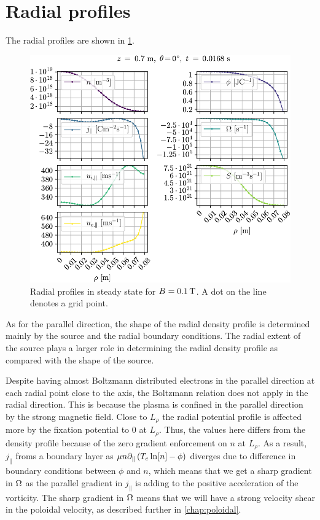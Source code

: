 \section{Radial profiles}
%
The radial profiles are shown in \cref{fig:radProfs}.
%
\begin{figure}[htb]
    \centering
    \includegraphics{fig/results/1DProfiles/B010Rad}
    \caption{Radial profiles in steady state for $B=0.1\, \text{T}$.
        A dot on the line denotes a grid point.
    }
    \label{fig:radProfs}
\end{figure}
%
As for the parallel direction, the shape of the radial density profile is determined mainly by the source and the radial boundary conditions.
The radial extent of the source plays a larger role in determining the radial density profile as compared with the shape of the source.

Despite having almost Boltzmann distributed electrons in the parallel direction at each radial point close to the axis, the Boltzmann relation does not apply in the radial direction.
This is because the plasma is confined in the parallel direction by the strong magnetic field.
Close to $L_\rho$ the radial potential profile is affected more by the fixation potential to $0$ at $L_\rho$.
Thus, the values here differs from the density profile because of the zero gradient enforcement on $n$ at $L_\rho$.
As a result, $j_\|$ froms a boundary layer as $\mu n \partial_\|\left(T_e\ln[n]-\phi\right)$ diverges due to difference in boundary conditions between $\phi$ and $n$, which means that we get a sharp gradient in $\Omega$ as the parallel gradient in $j_\|$ is adding to the positive acceleration of the vorticity.
The sharp gradient in $\Omega$ means that we will have a strong velocity shear in the poloidal velocity, as described further in \cref{chap:poloidal}.
